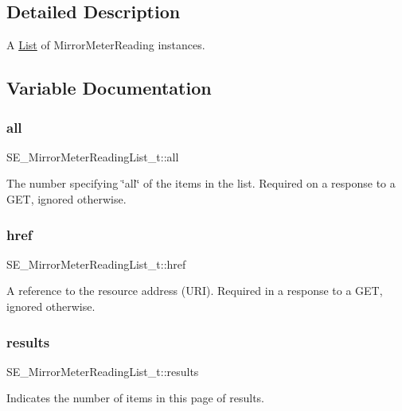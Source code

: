 \subsection{Detailed Description}
A \hyperlink{structList}{List} of Mirror\+Meter\+Reading instances. 

\subsection{Variable Documentation}
\mbox{\label{group__MirrorMeterReadingList_ga2dcd78e43b71829805f181a0749ea9ab}} 
\subsubsection{\texorpdfstring{all}{all}}
{\footnotesize\ttfamily S\+E\+\_\+\+Mirror\+Meter\+Reading\+List\+\_\+t\+::all}

The number specifying \char`\"{}all\char`\"{} of the items in the list. Required on a response to a G\+ET, ignored otherwise. \mbox{\label{group__MirrorMeterReadingList_gaefefadeff8d43344a34648716b272105}} 
\subsubsection{\texorpdfstring{href}{href}}
{\footnotesize\ttfamily S\+E\+\_\+\+Mirror\+Meter\+Reading\+List\+\_\+t\+::href}

A reference to the resource address (U\+RI). Required in a response to a G\+ET, ignored otherwise. \mbox{\label{group__MirrorMeterReadingList_ga06c065033d62755a9f1ab755638771f6}} 
\subsubsection{\texorpdfstring{results}{results}}
{\footnotesize\ttfamily S\+E\+\_\+\+Mirror\+Meter\+Reading\+List\+\_\+t\+::results}

Indicates the number of items in this page of results. 
